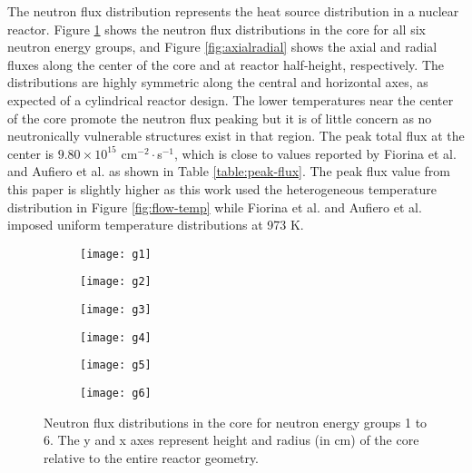 The neutron flux distribution represents the heat source distribution in a
nuclear reactor. Figure \ref{fig:neutronflux} shows the neutron flux
distributions in the core for all six neutron energy groups, and Figure
\ref{fig:axialradial} shows the axial and radial fluxes along the center of
the core and at reactor half-height, respectively.
The distributions are highly symmetric along the
central and horizontal axes, as expected of a cylindrical reactor design. The
lower temperatures near the center of the core promote the neutron
flux peaking but it is of little concern as no neutronically vulnerable
structures exist in that region. The peak total flux at the center is
$9.80 \times 10^{15}$ cm$^{-2}\cdot$s$^{-1}$, which is close to values
reported by Fiorina et al. \cite{fiorina_molten_2013} and Aufiero et al.
\cite{aufiero_development_2014} as shown in Table \ref{table:peak-flux}. The
peak flux value from this paper is slightly higher as this work used the
heterogeneous temperature distribution in Figure \ref{fig:flow-temp} while
Fiorina et al. and Aufiero et al. imposed uniform temperature distributions
at 973 K.

\begin{figure}[b!]
    \centering
    \begin{subfigure}[t]{.325\textwidth}
        \centering
        \texttt{[image: g1]}
    \end{subfigure}
    \begin{subfigure}[t]{.325\textwidth}
        \centering
        \texttt{[image: g2]}
    \end{subfigure}
    \begin{subfigure}[t]{.325\textwidth}
        \centering
        \texttt{[image: g3]}
    \end{subfigure}
    \begin{subfigure}[t]{.325\textwidth}
        \centering
        \texttt{[image: g4]}
    \end{subfigure}
    \begin{subfigure}[t]{.325\textwidth}
        \centering
        \texttt{[image: g5]}
    \end{subfigure}
    \begin{subfigure}[t]{.325\textwidth}
        \centering
        \texttt{[image: g6]}
    \end{subfigure}
    \caption{Neutron flux distributions in the core for neutron energy groups
    1 to 6. The y and x axes represent height and radius (in cm) of the core
    relative to the entire reactor geometry.}
    \label{fig:neutronflux}
\end{figure}

